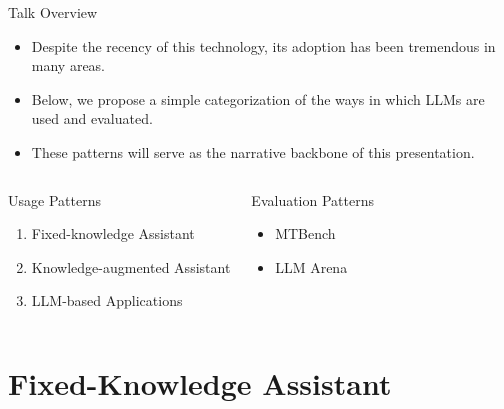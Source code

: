 \documentclass[handout]{beamer}
\begin{document}
\begin{frame}{Talk Overview}
\begin{scriptsize}
\begin{itemize}
 \item Despite the recency of this technology, its adoption has been tremendous in many areas. 
 \item Below, we propose a simple categorization of the ways in which LLMs are used and evaluated.
  \item These patterns will serve as the narrative backbone of this presentation.
\end{itemize}



\begin{columns}[t]
\begin{block}{Usage Patterns}
\begin{enumerate}
\item Fixed-knowledge Assistant
\item Knowledge-augmented Assistant
\item LLM-based Applications 
\end{enumerate}
\end{block}

\begin{block}{Evaluation Patterns}
\begin{itemize}
\item MTBench
\item LLM Arena
\end{itemize}
\end{block}

\end{columns}

\end{scriptsize}
\end{frame}










\section{Fixed-Knowledge Assistant}
\end{document}
